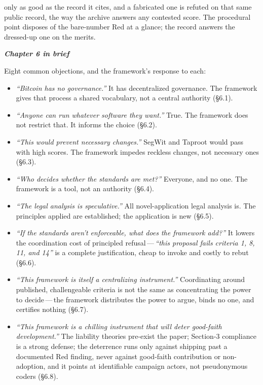 \documentclass[11pt, twoside, openright]{book}
\newcommand{\sect}[1]{\S#1}
\newcommand{\peheader}[1]{{\itshape\bfseries #1}\par\vspace{4pt}}
\begin{document}
only as good as the record it cites, and a fabricated one is refuted on that same public record, the way the archive answers any contested score. The procedural point disposes of the bare-number Red at a glance; the record answers the dressed-up one on the merits.

\needspace{3.5in}
\begin{plainenglish}
\peheader{Chapter 6 in brief}

Eight common objections, and the framework's response to each:

\begin{itemize}
  \item \textit{``Bitcoin has no governance.''} It has decentralized governance. The framework gives that process a shared vocabulary, not a central authority (\sect{6.1}).
  \item \textit{``Anyone can run whatever software they want.''} True. The framework does not restrict that. It informs the choice (\sect{6.2}).
  \item \textit{``This would prevent necessary changes.''} SegWit and Taproot would pass with high scores. The framework impedes reckless changes, not necessary ones (\sect{6.3}).
  \item \textit{``Who decides whether the standards are met?''} Everyone, and no one. The framework is a tool, not an authority (\sect{6.4}).
  \item \textit{``The legal analysis is speculative.''} All novel-application legal analysis is. The principles applied are established; the application is new (\sect{6.5}).
  \item \textit{``If the standards aren't enforceable, what does the framework add?''} It lowers the coordination cost of principled refusal\,---\,\textit{``this proposal fails criteria 1, 8, 11, and 14''} is a complete justification, cheap to invoke and costly to rebut (\sect{6.6}).
  \item \textit{``This framework is itself a centralizing instrument.''} Coordinating around published, challengeable criteria is not the same as concentrating the power to decide\,---\,the framework distributes the power to argue, binds no one, and certifies nothing (\sect{6.7}).

  \item \textit{``This framework is a chilling instrument that will deter good-faith development.''} The liability theories pre-exist the paper; Section-3 compliance is a strong defense; the deterrence runs only against shipping past a documented Red finding, never against good-faith contribution or non-adoption, and it points at identifiable campaign actors, not pseudonymous coders (\sect{6.8}).
\end{itemize}
\end{plainenglish}
\end{document}
